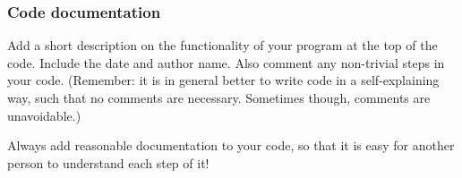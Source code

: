 \subsubsection{Code documentation}
Add a short description on the functionality of your program at the top of the code. Include the date and author name. Also comment any non-trivial steps in your code. (Remember: it is in general better to write code in a self-explaining way, such that no comments are necessary. Sometimes though, comments are unavoidable.) \newline
%
\begin{task}
  Always add reasonable documentation to your code, so that it is easy for another person to understand each step of it!
\end{task}
%
